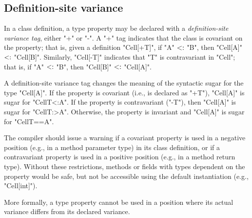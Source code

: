 \documentclass{llncs}
\begin{document}
\subsection{Definition-site variance}

In a class definition, 
a type property may be declared with a \emph{definition-site variance tag}, either \xcd"+" or
\xcd"-".  A \xcd"+" tag indicates that the class is covariant on
the property; that is, given a definition
\xcd"Cell[+T]",
if \xcd"A" $\subtype$ \xcd"B", then
\xcd"Cell[A]" $\subtype$ \xcd"Cell[B]".
Similarly,
\xcd"Cell[-T]" indicates that \xcd"T" is contravariant in \xcd"Cell";
that is, if \xcd"A" $\subtype$ \xcd"B", then
\xcd"Cell[B]" $\subtype$ \xcd"Cell[A]".

A definition-site variance tag changes the meaning of the
syntactic sugar for the type \xcd"Cell[A]".
If the property is covariant (i.e., is declared as \xcd"+T"), \xcd"Cell[A]"
is sugar for \xcd"Cell{T<:A}".
If the property is contravariant (\xcd"-T"), then \xcd"Cell[A]"
is sugar for \xcd"Cell{T:>A}".
Otherwise, the property is invariant and \xcd"Cell[A]"
is sugar for \xcd"Cell{T==A}".

The compiler should issue a warning if 
a covariant property is used in a negative position (e.g., in a
method parameter type)
in its class definition,
or if a contravariant property is used in a positive position
(e.g., in a method return type).
Without these restrictions, methods or fields with types
dependent on the property would be safe, but not be accessible 
using the default instantiation (e.g., \xcd"Cell[int]").

More formally, a type property cannot be used in a position
where its actual variance differs from its declared variance.




\infrule{
\vdash_{+}
}{}
\fi
\end{document}

